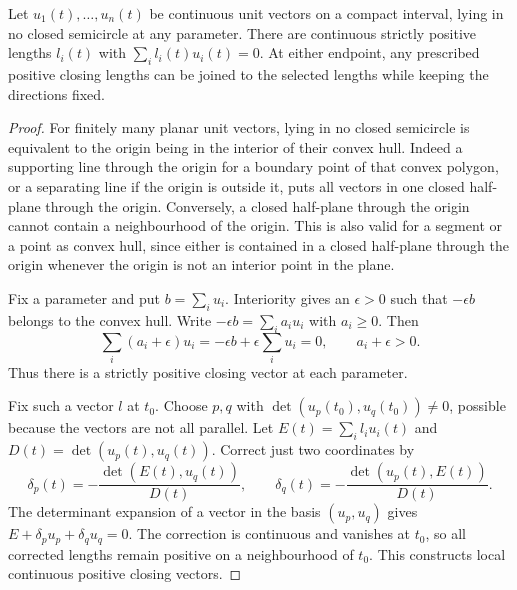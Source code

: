 \begin{lemma}
\label{lem:transport-lengths}
Let $u_1(t),\ldots,u_n(t)$ be continuous unit vectors on a compact interval,
lying in no closed semicircle at any parameter. There are continuous strictly
positive lengths $l_i(t)$ with $\sum_i l_i(t)u_i(t)=0$. At either endpoint,
any prescribed positive closing lengths can be joined to the selected lengths
while keeping the directions fixed.
\end{lemma}
\begin{proof}
For finitely many planar unit vectors, lying in no closed semicircle is
equivalent to the origin being in the interior of their convex hull.
Indeed a supporting line through the origin for a boundary point of that
convex polygon, or a separating line if the origin is outside it, puts all
vectors in one closed half-plane through the origin. Conversely, a closed
half-plane through the origin cannot contain a neighbourhood of the origin.
This is also valid for a segment or a point as convex hull, since either is
contained in a closed half-plane through the origin whenever the origin is
not an interior point in the plane.

Fix a parameter and put $b=\sum_i u_i$. Interiority gives an $\epsilon>0$
such that $-\epsilon b$ belongs to the convex hull. Write
$-\epsilon b=\sum_i a_i u_i$ with $a_i\geq0$. Then
\begin{equation}\label{transport:positive-close}
 \sum_i(a_i+\epsilon)u_i=-\epsilon b+\epsilon\sum_i u_i=0,
 \qquad a_i+\epsilon>0.
\end{equation}
Thus there is a strictly positive closing vector at each parameter.

Fix such a vector $l$ at $t_0$. Choose $p,q$ with
$\det(u_p(t_0),u_q(t_0))\ne0$, possible because the vectors are not all
parallel. Let $E(t)=\sum_i l_i u_i(t)$ and
$D(t)=\det(u_p(t),u_q(t))$. Correct just two coordinates by
\begin{equation}\label{transport:cramer}
 \delta_p(t)=-\frac{\det(E(t),u_q(t))}{D(t)},\qquad
 \delta_q(t)=-\frac{\det(u_p(t),E(t))}{D(t)}.
\end{equation}
The determinant expansion of a vector in the basis $(u_p,u_q)$ gives
$E+\delta_pu_p+\delta_qu_q=0$. The correction is continuous and vanishes
at $t_0$, so all corrected lengths remain positive on a neighbourhood of
$t_0$. This constructs local continuous positive closing vectors.


\end{proof}
